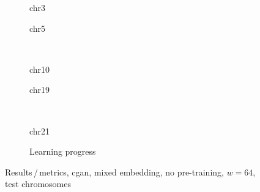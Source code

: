 \begin{figure}[p] %
    \begin{subfigure}{0.45\textwidth}
        \scriptsize
        \caption{chr3}
    \end{subfigure} \hfill
    \begin{subfigure}{0.45\textwidth}
        \scriptsize
        \caption{chr5}
    \end{subfigure}\\[5mm]
    \begin{subfigure}{0.45\textwidth}
        \scriptsize
        \caption{chr10}
    \end{subfigure}\hfill
    \begin{subfigure}{0.45\textwidth}
        \scriptsize
        \caption{chr19}
    \end{subfigure}\\[3mm]
    \centering
    \begin{subfigure}{0.45\textwidth}
        \scriptsize
        \caption{chr21}
    \end{subfigure} \hfill
    \begin{subfigure}{0.45\textwidth}
        \scriptsize
        \caption{Learning progress} \label{fig:results:GAN64_mixed_lossEpochs}
    \end{subfigure}
    \caption{Results\,/\,metrics, \acrshort{cgan}, mixed embedding, no pre-training, $w=64$, test chromosomes}   \label{fig:results:GAN64_mixed_pearson}
\end{figure}
